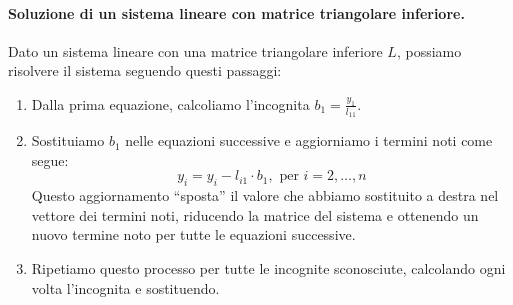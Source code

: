 \documentclass{article}
\begin{document}
\paragraph{Soluzione di un sistema lineare con matrice triangolare
inferiore.}\label{para:soluzione_interpolazione_newton}
Dato un sistema lineare con una matrice triangolare inferiore $L$, possiamo
risolvere il sistema seguendo questi passaggi:
\begin{enumerate}
    \item Dalla prima equazione, calcoliamo l'incognita
        $b_1=\frac{y_1}{l_{11}}$.
    \item Sostituiamo $b_1$ nelle equazioni successive e aggiorniamo i termini
        noti come segue: $$y_i=y_i-l_{i1}\cdot b_1, \text{ per }i=2,\ldots,n$$
        Questo aggiornamento ``sposta'' il valore che abbiamo sostituito a
        destra nel vettore dei termini noti, riducendo la matrice del sistema
        e ottenendo un nuovo termine noto per tutte le equazioni successive.
    \item Ripetiamo questo processo per tutte le incognite sconosciute,
        calcolando ogni volta l'incognita e sostituendo.
\end{enumerate}
\end{document}
